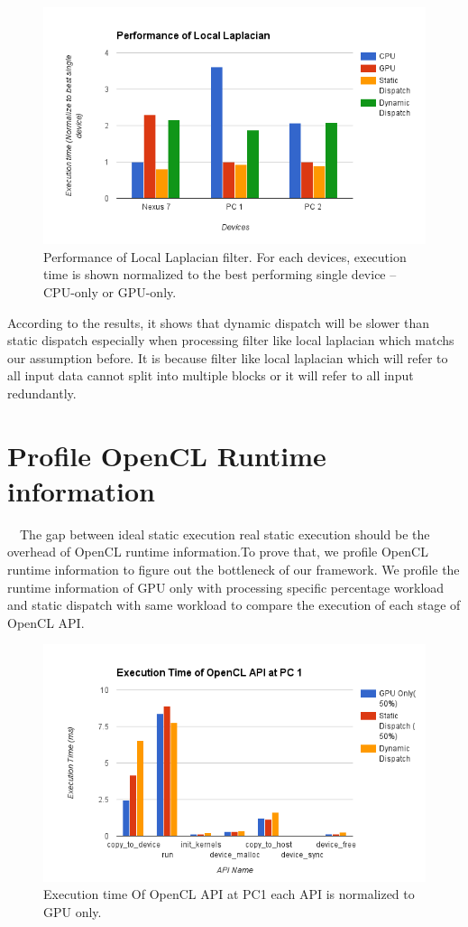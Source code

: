 \begin{figure}[!hbtp]
\centering
\includegraphics[width=12cm]{img/PerformanceOfLocalLaplacian.png}
\caption{Performance of Local Laplacian  filter. For each devices, execution time is shown normalized to the best performing single device – CPU-only or GPU-only.}
\label{fig:my_label}
\end{figure}

According to the results, it shows that dynamic dispatch will be slower than static dispatch especially when processing filter like local laplacian which matchs our assumption before. It is because filter like local laplacian which will refer to all input data cannot split into multiple blocks or it will refer to all input redundantly. 

\section{Profile OpenCL Runtime information}

\quad \  \ The gap between ideal static execution real static execution should be the overhead of OpenCL runtime information.To prove that, we profile OpenCL runtime information to figure out the bottleneck of our framework. We profile the runtime information of GPU only with processing specific percentage workload and static dispatch with same workload to compare the execution of each stage of OpenCL API.


\begin{figure}[!hbtp]
\centering
\includegraphics[width=12cm]{img/ExecutionTimeOfAPI(Bilateal@PC1).png}
\caption{Execution time Of OpenCL API at PC1 each API is normalized to GPU only.}
\label{fig:my_label}
\end{figure}

